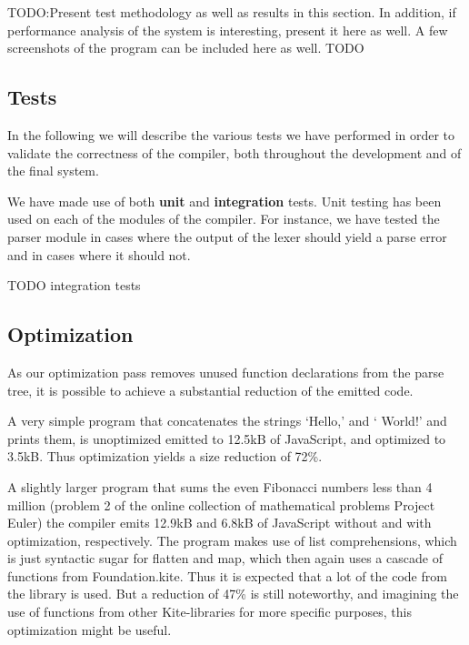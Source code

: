 TODO:Present test methodology as well as results in this section. In addition, if performance
analysis of the system is interesting, present it here as well.
A few screenshots of the program can be included here as well. TODO



\subsection{Tests}

In the following we will describe the various tests we have performed in order to validate the correctness of the compiler, both throughout the development and of the final system.

We have made use of both \textbf{unit} and \textbf{integration} tests. Unit testing has been used on each of the modules of the compiler. For instance, we have tested the parser module in cases where the output of the lexer should yield a parse error and in cases where it should not.

TODO integration tests

\subsection{Optimization}
As our optimization pass removes unused function declarations from the parse tree, it is possible to achieve a substantial reduction of the emitted code.

A very simple program that concatenates the strings `Hello,' and ` World!' and prints them, is unoptimized emitted to 12.5kB of JavaScript, and optimized to 3.5kB. Thus optimization yields a size reduction of 72\%.

A slightly larger program that sums the even Fibonacci numbers less than 4 million (problem 2 of the online collection of mathematical problems Project Euler\cite{euler}) the compiler emits 12.9kB and 6.8kB of JavaScript without and with optimization, respectively. The program makes use of list comprehensions, which is just syntactic sugar for flatten and map, which then again uses a cascade of functions from Foundation.kite. Thus it is expected that a lot of the code from the library is used. But a reduction of 47\% is still noteworthy, and imagining the use of functions from other Kite-libraries for more specific purposes, this optimization might be useful. 


